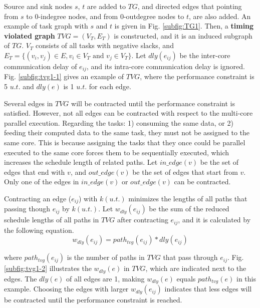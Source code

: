 \documentclass[10pt,journal]{IEEEtran}
\begin{document}
Source and sink nodes $s$, $t$ are added to $TG$, and directed edges that pointing from $s$ to 0-indegree nodes, and from 0-outdegree nodes to $t$, are also added. An example of task graph with $s$ and $t$ is given in Fig. \ref{subfig:TG1}. Then, a \textbf{timing violated graph} $TVG=(V_T, E_T)$ is constructed, and it is an induced subgraph of $TG$. $V_T$ consists of all tasks with negative slacks, and $E_T=\{(v_i,v_j)\in E, v_i\in V_T \textrm{~and~} v_j\in V_T\}$. Let $dly(e_{ij})$ be the inter-core communication delay of $e_{ij}$, and its intra-core communication delay is ignored. Fig. \ref{subfig:tvg1-1} gives an example of $TVG$, where the performance constraint is 5 $u.t.$ and $dly(e)$ is 1 $u.t.$ for each edge.


Several edges in $TVG$ will be contracted until the performance constraint is satisfied. However, not all edges can be contracted with respect to the multi-core parallel execution. Regarding the tasks: 1) consuming the same data, or 2) feeding their computed data to the same task, they must not be assigned to the same core. This is because assigning the tasks that they once could be parallel executed to the same core forces them to be sequentially executed, which increases the schedule length of related paths. Let $in\_edge(v)$ be the set of edges that end with $v$, and $out\_edge(v)$ be the set of edges that start from $v$. Only one of the edges in $in\_edge(v)$ or $out\_edge(v)$ can be contracted.



Contracting an edge ($e_{ij}$) with $k(u.t.)$ minimizes the lengths of all paths that passing though $e_{ij}$ by $k(u.t.)$. Let $w_{dly}(e_{ij})$ be the sum of the reduced schedule lengths of all paths in $TVG$ after contracting $e_{ij}$, and it is calculated by the following equation.
\begin{equation}
w_{dly}(e_{ij})=path_{tvg}(e_{ij})*dly(e_{ij})
\end{equation}


\noindent where $path_{tvg}(e_{ij})$ is the number of paths in $TVG$ that pass through $e_{ij}$.  Fig. \ref{subfig:tvg1-2} illustrates the $w_{dly}(e)$ in $TVG$, which are indicated next to the edges. The $dly(e)$ of all edges are 1, making $w_{dly}(e)$ equals $path_{tvg}(e)$ in this example. Choosing the edges with larger $w_{dly}(e_{ij})$ indicates that less edges will be contracted until the performance constraint is reached.



\end{document}
